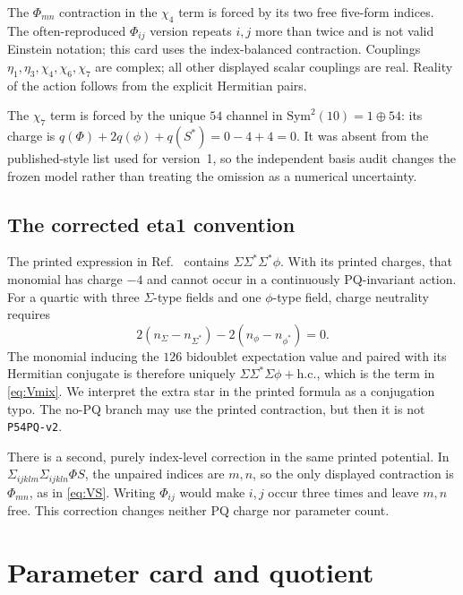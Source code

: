 \documentclass[11pt]{article}
\newcommand{\hc}{\mathrm{h.c.}}
\begin{document}
The $\Phi_{mn}$ contraction in the $\chi_4$ term is forced by its two free
five-form indices.  The often-reproduced $\Phi_{ij}$ version repeats $i,j$
more than twice and is not valid Einstein notation; this card uses the
index-balanced contraction.  Couplings
$\eta_1,\eta_3,\chi_4,\chi_6,\chi_7$ are complex; all other displayed scalar
couplings are real.  Reality of the action follows from the explicit
Hermitian pairs.

The $\chi_7$ term is forced by the unique $54$ channel in
$\mathrm{Sym}^2(10)=1\oplus54$: its charge is
$q(\Phi)+2q(\phi)+q(S^*)=0-4+4=0$.  It was absent from the published-style
list used for version~1, so the independent basis audit changes the frozen
model rather than treating the omission as a numerical uncertainty.

\subsection{The corrected eta1 convention}

The printed expression in Ref.~\cite{BabuKhan2015} contains
$\Sigma\Sigma^*\Sigma^*\phi$.  With its printed charges, that monomial has
charge $-4$ and cannot occur in a continuously PQ-invariant action.  For a
quartic with three $\Sigma$-type fields and one $\phi$-type field, charge
neutrality requires
\begin{equation}
 2(n_\Sigma-n_{\Sigma^*})-2(n_\phi-n_{\phi^*})=0.
\end{equation}
The monomial inducing the $126$ bidoublet expectation value and paired with
its Hermitian conjugate is therefore uniquely
$\Sigma\Sigma^*\Sigma\phi+\hc$, which is the term in
\eqref{eq:Vmix}.  We interpret the extra star in the printed formula as a
conjugation typo.  The no-PQ branch may use the printed contraction, but then
it is not \texttt{P54PQ-v2}.

There is a second, purely index-level correction in the same printed
potential.  In $\Sigma_{ijklm}\Sigma_{ijkln}\Phi S$, the unpaired indices are
$m,n$, so the only displayed contraction is $\Phi_{mn}$, as in
\eqref{eq:VS}.  Writing $\Phi_{ij}$ would make $i,j$ occur three times and
leave $m,n$ free.  This correction changes neither PQ charge nor parameter
count.

\section{Parameter card and quotient}
\end{document}
